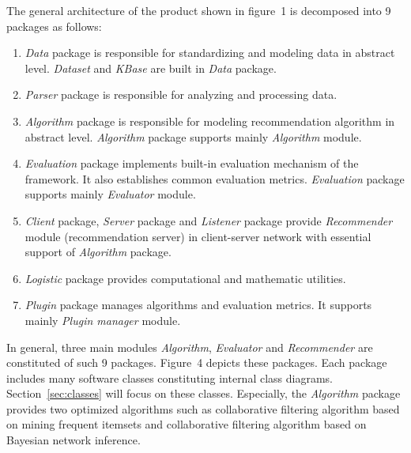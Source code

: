 \documentclass[a4paper]{llncs}
\begin{document}
The general architecture of the product shown in figure~1 is decomposed into 9 packages as follows:
\begin{enumerate}
\item \textit{Data} package is responsible for standardizing and modeling data in abstract level. \textit{Dataset} and \textit{KBase} are built in \textit{Data} package.
\item \textit{Parser} package is responsible for analyzing and processing data.
\item \textit{Algorithm} package is responsible for modeling recommendation algorithm in abstract level. \textit{Algorithm} package supports mainly \textit{Algorithm} module.
\item \textit{Evaluation} package implements built-in evaluation mechanism of the framework. It also establishes common evaluation metrics. \textit{Evaluation} package supports mainly \textit{Evaluator} module.
\item \textit{Client} package, \textit{Server} package and \textit{Listener} package provide \textit{Recommender} module (recommendation server) in client-server network with essential support of \textit{Algorithm} package.
\item \textit{Logistic} package provides computational and mathematic utilities.
\item \textit{Plugin} package manages algorithms and evaluation metrics. It supports mainly \textit{Plugin manager} module.
\end{enumerate}
In general, three main modules \textit{Algorithm}, \textit{Evaluator} and \textit{Recommender} are constituted of such 9 packages. Figure~4 depicts these packages. Each package includes many software classes constituting internal class diagrams. Section~\ref{sec:classes} will focus on these classes. Especially, the \textit{Algorithm} package provides two optimized algorithms such as collaborative filtering algorithm based on mining frequent itemsets and collaborative filtering algorithm based on Bayesian network inference.
\end{document}
